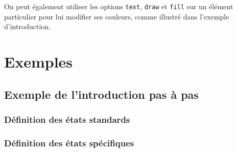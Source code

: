\documentclass[a4paper,11pt]{report}
\newcommand{\inputTikZ}[1]{%
  }%
\newcommand{\inputTikZ}[1]{%
    \texttt{[image: fig/\#1.pdf]}%
  }%
\begin{document}
On peut également utiliser les options {\tt text}, {\tt draw} et {\tt fill} sur un élément particulier pour lui modifier ses couleurs, comme illustré dans l'exemple d'introduction.

\section{Exemples}

\subsection{Exemple de l'introduction pas à pas}

\subsubsection{Définition des états standards}

\medskip

\begin{center}
\inputTikZ{figure61}
\end{center}

\newpage

{\color{red!70!black}
\vspace{-0.37cm}
\vspace{-0.37cm}
\vspace{-0.37cm}
\vspace{-0.37cm}
\vspace{-0.37cm}

}

\vspace{-0.5cm}

\subsubsection{Définition des états spécifiques}

\medskip

\begin{center}
\inputTikZ{figure62}
\end{center}

\medskip
\end{document}
